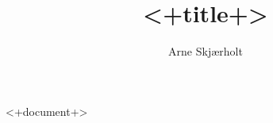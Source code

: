 \documentclass[11pt]{article}
\title{<+title+>}
\author{Arne Skjærholt}
\begin{document}
\maketitle

<+document+>
\end{document}

